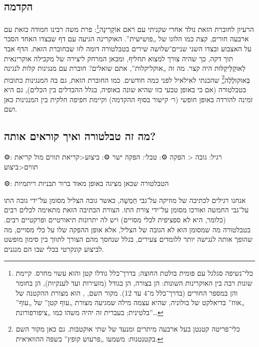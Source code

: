 \subsection*{הקדמה}

הרעיון לחוברת הזאת נולד אחרי שקניתי עם ראם אוֹקָרִינָה\footnote{כלי־נשיפה סגלגל עם פומית בולטת החוצה; בדרך־כלל גודלו קטן והוא עשוי מחרס. קיימת שונות רבה בין האוקרינות השונות: הן בצורה, הן בגודל (מזעירות ועד לענקיות), הן בחומר והן במספר החורים (בדרך־כלל מ־4 עד 12). מקור השם, , הוא מצורת ההקטנה של  „אווז” בדיאלקט של בולוניה, שהיא עצמה מילה שמגיעה מצורת  „עוף קטן” של  „עוף” בלטינית; בעברית זה יהיה משהו כמו „ציפורפורונת”…}: פרת משה רבינו חמודה כזאת עם ארבעה חורים, קצת כמו הלוגו של „פושישית”. האוקרינה הגיעה עם דף שבצדו האחד הסבר על האצבוע ובצדו השני שניים־שלושה שירים בטבלטורה דומה לזו שבחוברת הזאת. הדף אבד תוך דקה, כך שהיה צורך למצוא תחליף, ומכאן המרחק ליצירה של מקבילה אוקרינאית לְאוּקַלֵּיקַלּוּת היה קצר. מה זה „אוקליקלות”, אתם שואלים? חוברת עם מנגינות קלות לנגינה בְּאוּקוּלֶלֶה\footnote{כלי־פריטה קטנטן בעל ארבעה מיתרים ומנעד של שתי אוקטבות. גם כאן מקור השם בקטנטנוּת:  משמעו „פרעוש קופץ” בשפה ההוואיאית.} שהכנתי לאילאיל לפני כמה חודשים. כמו החוברת הזאת, גם בה המנגינות כתובות בטבלטורה (אם כי באופן טבעי כזו שהיא שונה באופיה, בגלל ההבדלים בין הכלים), גם היא זמינה להורדה באופן חופשי (ר׳ קישור בסוף ההקדמה) וקיימת חפיפה חלקית בין המנגינות כאן ושם.



\subsection*{מה זה טבלטורה ואיך קוראים אותה?}

⚙: רגיל: גובה < הפקה
⚙: טבל׳: הפקה ישר
⚙: ביצוע<קריאת תווים מול קריאת תווים<ביצוע

⚙: הטבלטורה שכאן מציגה באופן מאוד ברור תבניות ריתמיות

אנחנו רגילים לכתיבה של מוזיקה על־גבי חַמְשָׁה, כאשר גובה הצליל מסומן על־ידי גובה התו על־גבי החמשה ואורכו מסומן על־ידי צורת התו. הצורת הכתיבה הזאת מתאימה לכלים רבים (כלומר, היא לא ספציפית לכלי מסויים) ויש לה יתרונות תיאורטיים ופרקטיים רבים. בטבלטורה מה שמסומן הוא לא הגובה של הצליל, אלא אופן ההפקה שלו על כלי מסויים, מה שהופך אותה לנגישה יותר ללומדים צעירים, בגלל שנחסך מהם הצורך לתווך בין סימון מופשט לביצוע קונקרטי בכלי שבו הם מנגנים.

